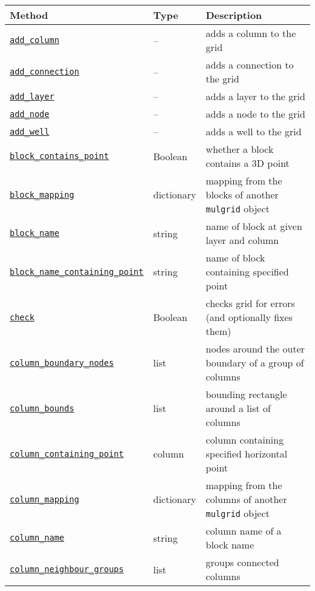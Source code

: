 \begin{center}
\begin{longtable}{|l|l|p{70mm}|}
  \hline
  \textbf{Method} & \textbf{Type} & \textbf{Description}\\
  \hline
  \hyperref[sec:add_column]{\texttt{add\_column}} & -- & adds a column to the grid\\ 
  \hyperref[sec:add_connection]{\texttt{add\_connection}} & -- & adds a connection to the grid\\ 
  \hyperref[sec:add_layer]{\texttt{add\_layer}} & -- & adds a layer to the grid\\ 
  \hyperref[sec:add_node]{\texttt{add\_node}} & -- & adds a node to the grid\\ 
  \hyperref[sec:add_well]{\texttt{add\_well}} & -- & adds a well to the grid\\ 
  \hyperref[sec:block_contains_point]{\texttt{block\_contains\_point}} & Boolean & whether a block contains a 3D point\\
  \hyperref[sec:block_mapping]{\texttt{block\_mapping}} & dictionary & mapping from the blocks of another \texttt{mulgrid} object\\
  \hyperref[sec:block_name]{\texttt{block\_name}} & string & name of block at given layer and column\\
  \hyperref[sec:block_name_containing_point]{\texttt{block\_name\_containing\_point}} & string & name of block containing specified point\\
  \hyperref[sec:check]{\texttt{check}} & Boolean & checks grid for errors (and optionally fixes them)\\ 
  \hyperref[sec:column_boundary_nodes]{\texttt{column\_boundary\_nodes}} & list & nodes around the outer boundary of a group of columns\\ 
  \hyperref[sec:column_bounds]{\texttt{column\_bounds}} & list & bounding rectangle around a list of columns\\ 
  \hyperref[sec:column_containing_point]{\texttt{column\_containing\_point}} & column & column containing specified horizontal point\\ 
  \hyperref[sec:column_mapping]{\texttt{column\_mapping}} & dictionary & mapping from the columns of another \texttt{mulgrid} object\\
  \hyperref[sec:column_name]{\texttt{column\_name}} & string & column name of a block name\\ 
  \hyperref[sec:column_neighbour_groups]{\texttt{column\_neighbour\_groups}} & list & groups connected columns\\ 

\end{longtable}
\end{center}

